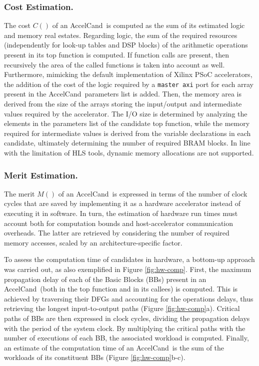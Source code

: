 \documentclass[]{usiinfthesis}
\newcommand{\candidate}{{AccelCand}}
\begin{document}
\subsubsection{Cost Estimation.}
The cost $C()$ of an \candidate\ is computed as the sum of its estimated logic and memory 
real estates. Regarding logic, the sum of the required resources (independently for look-up 
tables and DSP blocks) of the arithmetic operations present in its top function is computed.
If function calls are present, then recursively the area of the called functions is taken into
account as well. Furthermore, mimicking the default implementation of Xilinx PSoC accelerators, 
the addition of the cost of the logic required by a \texttt{master axi} port for each array 
present in the \candidate\ parameters list is added.
Then, the memory area is derived from the size of the arrays storing the input/output and intermediate 
values required by the accelerator. The I/O size is determined by analyzing the elements in the 
parameters list of the candidate top function, while the memory required for intermediate values is 
derived from the variable declarations in each candidate, ultimately determining the number of required 
BRAM blocks. In line with the limitation of HLS tools, dynamic memory allocations are not supported.\par

\subsubsection{Merit Estimation.}
The merit $M()$ of an \candidate\ is expressed in terms of the number of clock cycles that are saved by 
implementing it as a hardware accelerator instead of executing it in software. In turn, the estimation 
of hardware run times must account both for computation bounds and host-accelerator communication overheads.  
The latter are retrieved by considering the number of required memory accesses, scaled by an 
architecture-specific factor.\par

To assess the computation time of candidates in hardware, a bottom-up approach was carried out, as also 
exemplified in Figure \ref{fig:hw-comp}. First, the maximum propagation delay of each of the Basic Blocks 
(BBs) present in an \candidate\ (both in the top function and in its callees) is computed.  This is 
achieved by traversing their DFGs and accounting for the operations delays, thus retrieving the longest 
input-to-output paths (Figure \ref{fig:hw-comp}a).  Critical paths of BBs are then expressed in clock cycles, 
dividing the propagation delays with the period of the system clock. By multiplying the critical paths with 
the number of executions of each BB, the associated workload is computed. Finally, an estimate of the computation time of an \candidate\ is the sum of the workloads of its constituent BBs 
(Figure \ref{fig:hw-comp}b-c).\par
\end{document}
